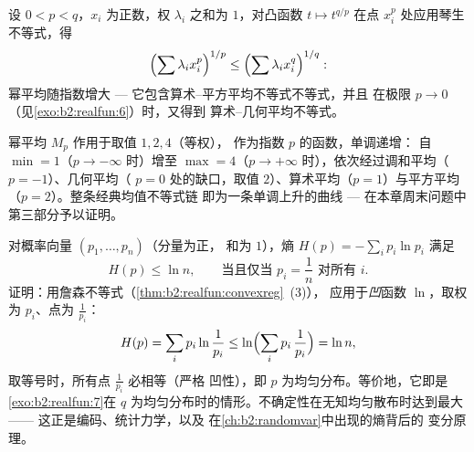 \begin{example}[幂平均不等式]\label{ex:b2:realfun:powermeans}
设 $0 < p < q$，$x_i$ 为正数，权 $\lambda_i$
之和为 $1$，对凸函数 $t \mapsto t^{q/p}$
在点 $x_i^p$ 处应用琴生不等式，得
\[
\Bigl(\sum \lambda_i x_i^{p}\Bigr)^{1/p}
\leq \Bigl(\sum \lambda_i x_i^{q}\Bigr)^{1/q} :
\]
幂平均随指数增大 --- 它包含算术–平方平均不等式不等式，并且
在极限 $p \to 0$（见\cref{exo:b2:realfun:6}）时，又得到
算术–几何平均不等式。
\end{example}

\begin{omfigure}

{\small 幂平均 $M_p$ 作用于取值 $1, 2, 4$（等权），
作为指数 $p$ 的函数，单调递增：
自 $\min = 1$（$p \to -\infty$ 时）增至 $\max = 4$（$p \to
+\infty$ 时），依次经过调和平均（$p = -1$）、几何平均（
$p = 0$ 处的缺口，取值 $2$）、算术平均（$p = 1$）与平方平均（$p
= 2$）。整条经典均值不等式链
即为一条单调上升的曲线 --- 在本章周末问题中
第三部分予以证明。}
\end{omfigure}

\begin{example}[最大熵]\label{ex:b2:realfun:entropy}
对概率向量 $(p_1, \dots, p_n)$（分量为正，
和为 $1$），熵 $H(p) = -\sum_i p_i\ln p_i$
满足
\[
H(p) \leq \ln n ,
\qquad\text{当且仅当 } p_i = \frac1n \text{ 对所有 }
i .
\]
证明：用詹森不等式（\cref{thm:b2:realfun:convexreg}~(3)），
应用于\emph{凹}函数 $\ln$，取权为 $p_i$、点为
$\frac{1}{p_i}$：
\[
H(p) = \sum_i p_i\ln\frac{1}{p_i}
\leq \ln\Bigl(\sum_i p_i\,\frac1{p_i}\Bigr) = \ln n ,
\]
取等号时，所有点 $\frac1{p_i}$ 必相等（严格
凹性），即 $p$ 为均匀分布。等价地，它即是
\cref{exo:b2:realfun:7}在 $q$ 为均匀分布时的情形。不确定性在无知均匀散布时达到最大——
这正是编码、统计力学，以及
在\cref{ch:b2:randomvar}中出现的熵背后的
变分原理。
\end{example}

